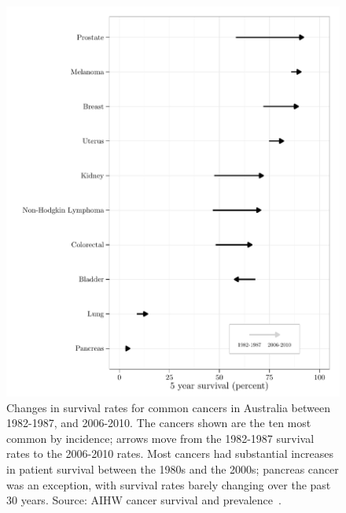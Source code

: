 \documentclass[thesis.tex]{subfiles}
\begin{document}
\begin{figure}[!htbp]
\centering
\includegraphics[width=.9\linewidth]{analysis/intro/figure/historical-survival-all-1}
\caption[Historical survival rates of common cancers]{Changes in survival rates for common cancers in Australia between 1982-1987, and 2006-2010.  The cancers shown are the ten most common by incidence; arrows move from the 1982-1987 survival rates to the 2006-2010 rates.  Most cancers had substantial increases in patient survival between the 1980s and the 2000s; pancreas cancer was an exception, with survival rates barely changing over the past 30 years.  Source: AIHW cancer survival and prevalence~\cite{CAN65}.}\label{fig:intro-historical-all-surv}
\end{figure}
\end{document}
